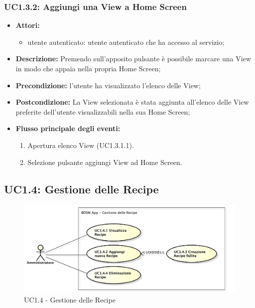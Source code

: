 \subsubsection{UC1.3.2: Aggiungi una View a Home Screen}

\begin{itemize}
	\item \textbf{Attori:}
	\begin{itemize}
		\item utente autenticato: utente autenticato che ha accesso al servizio;
	\end{itemize}
	\item \textbf{Descrizione:} Premendo sull'apposito pulsante è possibile marcare una View in modo che appaia nella propria Home Screen;	
	\item \textbf{Precondizione:} l'utente ha visualizzato l'elenco delle View;
	\item \textbf{Postcondizione:} La View selezionata è stata aggiunta all'elenco delle View preferite dell'utente visualizzabili nella sua Home Screen;
	\item \textbf{Flusso principale degli eventi:}
	\begin{enumerate}
		\item Apertura elenco View (UC1.3.1.1).
		\item Selezione pulsante aggiungi View ad Home Screen.		
	\end{enumerate}
\end{itemize}

\pagebreak


\subsection{UC1.4: Gestione delle Recipe}

\begin{figure}[!ht]
	\centering
	\centerline{\includegraphics[scale=0.45]{./images/UC1_4.pdf}}
	\caption{UC1.4 - Gestione delle Recipe}
\end{figure}


